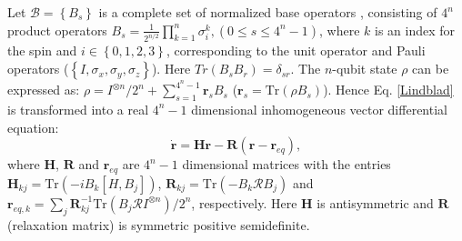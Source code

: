 \documentclass[prl,aps,twocolumn, reprint, amsmath,amssymb,showpacs,superscriptaddress]{revtex4}
\begin{document}
Let $\mathcal{B} = \left\{ B_s \right\}$ is a complete set of normalized base operators \cite{K, SW}, consisting of $4^{n}$ product operators ${{ B}_s} = \frac{1}{2^{n/2}} \prod\limits_{k = 1}^n { \sigma _{i}^k}, (0 \le s \le {4^n} - 1)$, where $k$ is an index for the spin and $i \in \left\{ {0,1,2,3} \right\}$, corresponding to the unit operator and Pauli operators ($\left\{ { I,{{ \sigma }_x},{{ \sigma }_y},{{ \sigma }_z}} \right\}$). Here $Tr({{ B}_s}{{ B}_r}) = {\delta _{sr}}$. The $n$-qubit state $\rho$ can be  expressed as: $\rho = {I^{ \otimes n}}/{2^n} + \sum\nolimits_{s = 1}^{{4^n-1}} {{\bm{r}_s}{B_s}} $ (${\bm{r}_s} = \text{Tr}\left( {\rho {B_s}} \right)$).
Hence Eq. \eqref{Lindblad} is transformed into a real $4^n -1$ dimensional inhomogeneous vector differential equation:
\begin{equation}
\label{Bloch}
\bm{\dot  r} = \mathbf{H} \bm{r} -  \mathbf{R} ( \bm{r} - {\bm{r}_{eq}}),
\end{equation}
where $\mathbf{H}$, $\mathbf{R}$  and $\bm{r}_{eq}$ are $4^n-1$ dimensional matrices with the entries ${\mathbf{H}_{kj}}  = \text{Tr} \left( {-i{B_k}\left[H, {{B_j}} \right]} \right)$, ${\mathbf{R}_{kj}} = \text{Tr}\left(- {{B_k}\mathcal{R}{B_j}} \right)$ and $\bm{r}_{eq,k}  = \sum\nolimits_j {{\mathbf{R}}_{kj}^{ - 1}{\text{Tr}}\left( {{B_j}{\mathcal R}{I^{ \otimes n}}} \right)/{2^n}} $, respectively. Here $\mathbf{H}$ is antisymmetric and $\mathbf{R}$ (relaxation matrix) is symmetric positive semidefinite.
\end{document}
